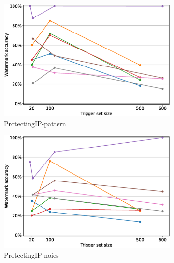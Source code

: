 \begin{figure}
\begin{subfigure}{0.41\linewidth}
        \includegraphics[width=\linewidth]{images/finetuning/ProtectingIP-pattern_finetuning_per_method_smalllr.eps}
        \caption{ProtectingIP-pattern}
        \label{fig:finetuning-smalllr-permethod-pattern}
    \end{subfigure}
    \quad
    \begin{subfigure}{0.41\linewidth}
        \includegraphics[width=\linewidth]{images/finetuning/ProtectingIP-noise_finetuning_per_method_smalllr.eps}
        \caption{ProtectingIP-noies}
        \label{fig:finetuning-smalllr-permethod-noise}
    \end{subfigure}
    \quad
    \begin{subfigure}{0.41\linewidth}

\end{subfigure}
\end{figure}
